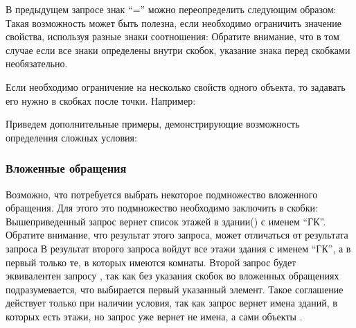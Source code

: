 В предыдущем запросе знак ``='' можно переопределить следующим образом:
Такая возможность может быть полезна, если необходимо ограничить значение свойства,
используя разные знаки соотношения:
Обратите внимание, что в том случае
если все знаки определены внутри скобок, указание знака перед скобками необязательно.

Если необходимо ограничение на несколько свойств одного объекта, то задавать его
нужно в скобках после точки. Например:

Приведем дополнительные примеры, демонстрирующие возможность определения сложных условия:







\subsubsection{Вложенные обращения}
Возможно, что потребуется выбрать некоторое подмножество вложенного обращения. Для этого
это подмножество необходимо заключить в скобки:
Вышеприведенный запрос вернет список этажей в здании() с именем ``ГК''. 
Обратите внимание, что результат этого запроса, может отличаться от результата запроса
В результат второго запроса войдут все этажи здания с именем ``ГК'', а в первый только те,
в которых имеются комнаты. Второй запрос будет эквивалентен запросу
,
так как без указания скобок во вложенных обращениях подразумевается, что выбирается первый указанный 
элемент. Такое соглашение действует только при наличии условия, так как запрос 
вернет имена зданий, в которых есть этажи, но запрос
уже вернет не имена, а сами объекты .

